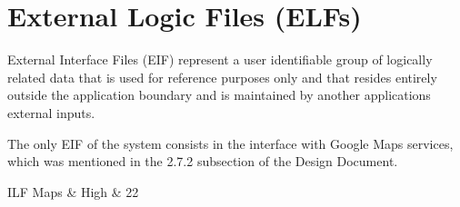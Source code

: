 \section{External Logic Files (ELFs)}

External Interface Files (EIF) represent a user identifiable group of logically related data that is used for reference purposes only and that resides entirely outside the application boundary and is maintained by another applications external inputs.

The only EIF of the system consists in the interface with Google Maps services, which was mentioned in the 2.7.2 subsection of the Design Document.

\begin{fpcounttable}{ILF}
Maps & High & 22 \\\hline
{}
\end{fpcounttable}
